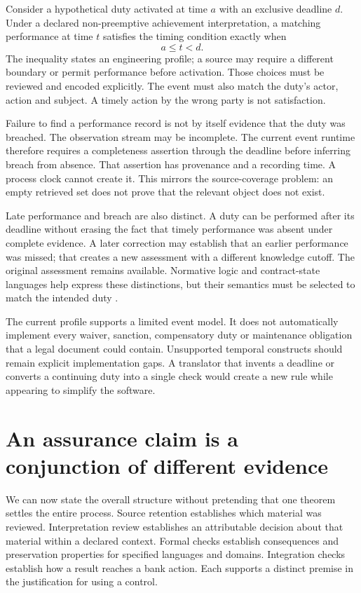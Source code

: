 \documentclass[12pt,a4paper,oneside,openany]{book}
\begin{document}
Consider a hypothetical duty activated at time $a$ with an exclusive deadline
$d$. Under a declared non-preemptive achievement interpretation, a matching
performance at time $t$ satisfies the timing condition exactly when
\begin{equation}
 a\leq t<d.
 \label{eq:performance-window}
\end{equation}
The inequality states an engineering profile; a source may require a different
boundary or permit performance before activation. Those choices must be
reviewed and encoded explicitly. The event must also match the duty's actor,
action and subject. A timely action by the wrong party is not satisfaction.

Failure to find a performance record is not by itself evidence that the duty
was breached. The observation stream may be incomplete. The current event
runtime therefore requires a completeness assertion through the deadline before
inferring breach from absence. That assertion has provenance and a recording
time. A process clock cannot create it. This mirrors the source-coverage
problem: an empty retrieved set does not prove that the relevant object does
not exist.

Late performance and breach are also distinct. A duty can be performed after
its deadline without erasing the fact that timely performance was absent under
complete evidence. A later correction may establish that an earlier performance
was missed; that creates a new assessment with a different knowledge cutoff.
The original assessment remains available. Normative logic and contract-state
languages help express these distinctions, but their semantics must be selected
to match the intended duty \citep{violations2006,normative2016,stipula2021}.

The current profile supports a limited event model. It does not automatically
implement every waiver, sanction, compensatory duty or maintenance obligation
that a legal document could contain. Unsupported temporal constructs should
remain explicit implementation gaps. A translator that invents a deadline or
converts a continuing duty into a single check would create a new rule while
appearing to simplify the software.

\section{An assurance claim is a conjunction of different evidence}
\label{sec:proof-assurance}
We can now state the overall structure without pretending that one theorem
settles the entire process. Source retention establishes which material was
reviewed. Interpretation review establishes an attributable decision about that
material within a declared context. Formal checks establish consequences and
preservation properties for specified languages and domains. Integration checks
establish how a result reaches a bank action. Each supports a distinct premise
in the justification for using a control.
\end{document}
